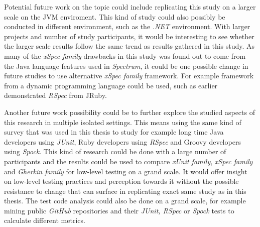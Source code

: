 Potential future work on the topic could include replicating this study on a larger scale on the JVM enviroment.
This kind of
study could also possibly be conducted in different environment, such as the \textit{.NET} environment. With
larger projects and number of study participants, it would be interesting to see whether the larger scale results
follow the same trend as results gathered in this study.
As many of the \textit{xSpec family} drawbacks in this study was found out to
come from the Java language features used in \textit{Spectrum}, it could be one possible change in future studies to use
alternative \textit{xSpec family} framework.
For example framework from a dynamic programming language could be used, such as earlier demonstrated \textit{RSpec} from JRuby.

Another future work possibility could be to further explore the studied aspects of this research in multiple isolated settings.
This means using the same kind of survey that was used in this thesis to study for example long time Java developers using \textit{JUnit},
Ruby developers using \textit{RSpec} and Groovy developers using \textit{Spock}.
This kind of research could be done with a large number of participants and the results
could be used to compare \textit{xUnit family}, \textit{xSpec family} and \textit{Gherkin family} for low-level testing on
a grand scale.
It would offer insight on low-level testing
practices and perception towards it without the possible resistance to change that can surface in replicating exact
same study as in this thesis. The test code analysis could also be done on a grand scale, for example mining
public \textit{GitHub} repositories and their \textit{JUnit, RSpec} or \textit{Spock} tests to calculate different metrics.
